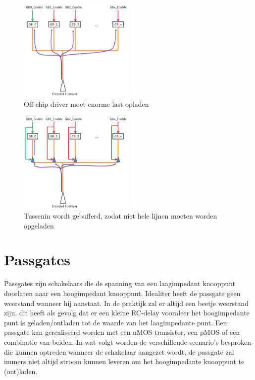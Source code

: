 \begin{figure}[h!]
  \centering
  \includegraphics[width=0.5\textwidth]{../fig/hfdstk-periphery-nodrivers.png}
  \caption{Off-chip driver moet enorme last opladen}
  \label{fig:nodrivers}
\end{figure}
\begin{figure}[h!]
  \centering
  \includegraphics[width=0.5\textwidth]{../fig/hfdstk-periphery-drivers.png}
  \caption{Tussenin wordt gebufferd, zodat niet hele lijnen moeten worden opgeladen}
  \label{fig:drivers}
\end{figure}

\section{Passgates}
Passgates zijn schakelaars die de spanning van een laagimpedant knooppunt doorlaten naar een hoogimpedant knooppunt. Idealiter heeft de passgate geen weerstand wanneer hij aanstaat. In de praktijk zal er altijd een beetje weerstand zijn, dit heeft als gevolg dat er een kleine RC-delay vooraleer het hoogimpedante punt is geladen/ontladen tot de waarde van het laagimpedante punt.
Een passgate kan gerealiseerd worden met een nMOS transistor, een pMOS of een combinatie van beiden.
In wat volgt worden de verschillende scenario's besproken die kunnen optreden wanneer de schakelaar aangezet wordt, de passgate zal immers niet altijd stroom kunnen leveren om het hoogimpedante knooppunt te (ont)laden.

